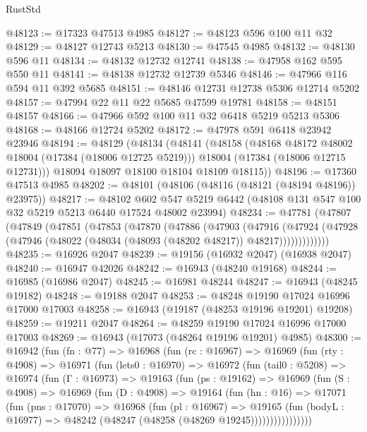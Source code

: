 \begin{lexlean}{RustStd}
\begin{coremodule}
@48123 := @17323 @47513 @4985
@48127 := @48123 @596 @100 @11 @32
@48129 := @48127 @12743 @5213
@48130 := @47545 @4985
@48132 := @48130 @596 @11
@48134 := @48132 @12732 @12741
@48138 := @47958 @162 @595 @550 @11
@48141 := @48138 @12732 @12739 @5346
@48146 := @47966 @116 @594 @11 @392 @5685
@48151 := @48146 @12731 @12738 @5306 @12714 @5202
@48157 := @47994 @22 @11 @22 @5685 @47599 @19781
@48158 := @48151 @48157
@48166 := @47966 @592 @100 @11 @32 @6418 @5219 @5213 @5306
@48168 := @48166 @12724 @5202
@48172 := @47978 @591 @6418 @23942 @23946
@48194 := @48129
    (@48134
      (@48141
        (@48158
          (@48168 @48172 @48002 @18004 (@17384 (@18006 @12725 @5219)))
          @18004
          (@17384 (@18006 @12715 @12731)))
        @18094
        @18097
        @18100
        @18104
        @18109
        @18115))
@48196 := @17360 @47513 @4985
@48202 := @48101 (@48106 (@48116 (@48121 (@48194 @48196)) @23975))
@48217 := @48102
    @602
    @547
    @5219
    @6442
    (@48108 @131 @547 @100 @32 @5219 @5213 @6440 @17524 @48002 @23994)
@48234 := @47781
    (@47807
      (@47849
        (@47851
          (@47853
            (@47870
              (@47886
                (@47903
                  (@47916
                    (@47924
                      (@47928 (@47946 (@48022 (@48034 (@48093 (@48202 @48217)) @48217)))))))))))))
@48235 := @16926 @2047
@48239 := @19156 (@16932 @2047) (@16938 @2047)
@48240 := @16947 @42026
@48242 := @16943 (@48240 @19168)
@48244 := @16985 (@16986 @2047)
@48245 := @16981 @48244
@48247 := @16943 (@48245 @19182)
@48248 := @19188 @2047
@48253 := @48248 @19190 @17024 @16996 @17000 @17003
@48258 := @16943 (@19187 (@48253 @19196 @19201) @19208)
@48259 := @19211 @2047
@48264 := @48259 @19190 @17024 @16996 @17000 @17003
@48269 := @16943 (@17073 (@48264 @19196 @19201) @4985)
@48300 := @16942
    (fun (fn : @77) =>
    @16968
      (fun (rc : @16967) =>
      @16969
        (fun (rty : @4908) =>
        @16971
          (fun (lets0 : @16970) =>
          @16972
            (fun (tail0 : @5208) =>
            @16974
              (fun (Γ : @16973) =>
              @19163
                (fun (ps : @19162) =>
                @16969
                  (fun (S : @4908) =>
                  @16969
                    (fun (D : @4908) =>
                    @19164
                      (fun (hn : @16) =>
                      @17071
                        (fun (pns : @17070) =>
                        @16968
                          (fun (pl : @16967) =>
                          @19165
                            (fun (bodyL : @16977) =>
                            @48242 (@48247 (@48258 (@48269 @19245))))))))))))))))

\end{coremodule}
\end{lexlean}
